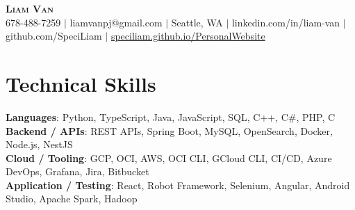 \documentclass[letterpaper,11pt]{article}
\begin{document}

%
\begin{center}
    \textbf{\Huge \scshape Liam Van} \\ \vspace{1pt}
    \small 678-488-7259 $|$ \small {liamvanpj@gmail.com} $|$ Seattle, WA
 {{$|$ linkedin.com/in/liam-van} {$|$ github.com/SpeciLiam} {$|$ \href{https://speciliam.github.io/PersonalWebsite}{speciliam.github.io/PersonalWebsite}}}

\end{center}

\section{Technical Skills}
 \begin{itemize}[leftmargin=0.15in, label={}]
    \small{\item{
     \textbf{Languages}{: Python, TypeScript, Java, JavaScript, SQL, C++, C\#, PHP, C} \\
     \textbf{Backend / APIs}{: REST APIs, Spring Boot, MySQL, OpenSearch, Docker, Node.js, NestJS} \\
     \textbf{Cloud / Tooling}{: GCP, OCI, AWS, OCI CLI, GCloud CLI, CI/CD, Azure DevOps, Grafana, Jira, Bitbucket} \\
     \textbf{Application / Testing}{: React, Robot Framework, Selenium, Angular, Android Studio, Apache Spark, Hadoop} \\
    }}
 \end{itemize}
%
\end{document}

